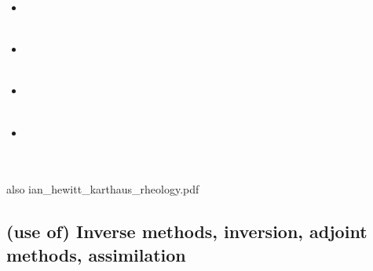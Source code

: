 \begin{scriptsize}
\begin{itemize}
\textcite{issg15} \cite{issg15}\\
\textcite{frlg15} \cite{frlg15}\\
\item[\twothousandsixteen] 
\textcite{krab16} \cite{krab16}\\
\textcite{daws16} \cite{daws16}\\
\item[\twothousandseventeen] 
\textcite{lolc17} \cite{lolc17}\\
\textcite{gors17} \cite{gors17}\\
\item[\twothousandeighteen] 
\textcite{heah18} \cite{heah18}\\
\textcite{mimr18} \cite{mimr18}\\
\item[\twothousandnineteen] 
\textcite{kudd19} \cite{kudd19}\\
\textcite{kuwd19} \cite{kuwd19}\\
\textcite{kuiper19} \cite{kuiper19}\\
\end{itemize}
\end{scriptsize}


also ian\_hewitt\_karthaus\_rheology.pdf

\subsection{(use of) Inverse methods, inversion, adjoint methods, assimilation}


